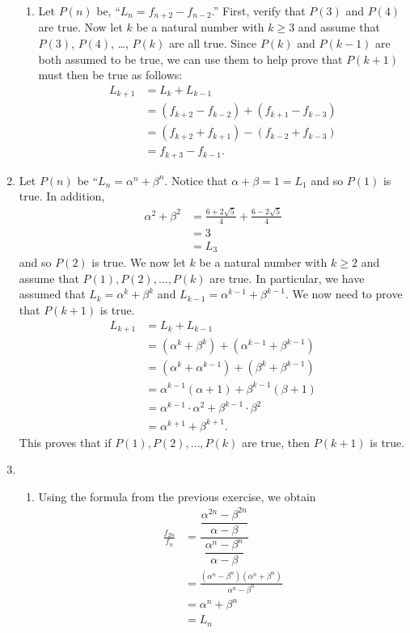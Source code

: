 \begin{enumerate}
\begin{enumerate}
\item Let $P(n)$ be, ``$L_n = f_{n+2} - f_{n-2}$.''  First, verify that $P(3)$ and $P(4)$ are true.  Now let $k$ be a natural number with $k \geq 3$ and assume that $P(3)$, $P(4)$, \ldots, 
$P(k)$ are all true. Since $P(k)$ and $P(k-1)$ are both assumed to be true, we can use them to help prove that $P(k+1)$ must then be true as follows:
\begin{align*}
L_{k+1} &= L_k + L_{k-1} \\
        &= \left( f_{k+2} - f_{k-2} \right) + \left( f_{k+1} - f_{k-3} \right) \\
        &= \left( f_{k+2} + f_{k+1} \right) - \left( f_{k-2} + f_{k-3} \right) \\
        &= f_{k+3} - f_{k-1}.
\end{align*}
\end{enumerate}


\item Let $P(n)$ be ``$L_n = \alpha^n + \beta^n$.  Notice that $\alpha + \beta = 1 = L_1$ and so $P(1)$ is true.  In addition,
\begin{align*}
\alpha^2 + \beta^2 &= \frac{6 + 2\sqrt{5}}{4} + \frac{6 - 2\sqrt{5}}{4} \\
                   &= 3 \\
                   &= L_3
\end{align*}
and so $P(2)$ is true.  We now let $k$ be a natural number with $k \geq 2$ and assume that $P(1), P(2), \ldots , P(k)$ are true.  In particular, we have assumed that $L_k = \alpha^k + \beta^k$ and $L_{k-1} = \alpha^{k-1} + \beta^{k-1}$.  We now need to prove that $P(k +1)$ is true.
\begin{align*}
L_{k+1} &= L_k + L_{k-1} \\
        &= \left( \alpha^k + \beta^k \right) + \left( \alpha^{k-1} + \beta^{k-1} \right) \\
        &= \left( \alpha^k + \alpha^{k-1} \right) + \left( \beta^k + \beta^{k-1} \right) \\
        &= \alpha^{k-1}(\alpha + 1) + \beta^{k-1}(\beta + 1) \\
        &= \alpha^{k-1} \cdot \alpha^2 + \beta^{k-1} \cdot \beta^2 \\
        &= \alpha^{k + 1} + \beta^{k + 1}.
\end{align*}
This proves that if $P(1), P(2), \ldots , P(k)$ are true, then $P(k + 1)$ is true.


\item \begin{enumerate}
\item Using the formula from the previous exercise, we obtain
\begin{align*}
\frac{f_{2n}}{f_n} &= \dfrac{\dfrac{\alpha^{2n} - \beta^{2n}}{\alpha - \beta}}{\dfrac{\alpha^{n} - \beta^{n}}{\alpha - \beta}}  \\
                   &= \frac{\left( \alpha^n - \beta^n \right) \left( \alpha^n + \beta^n \right)}{\alpha^n - \beta^n} \\
                   &= \alpha^n + \beta^n \\
                   &= L_n
\end{align*}



\end{enumerate}
\end{enumerate}
